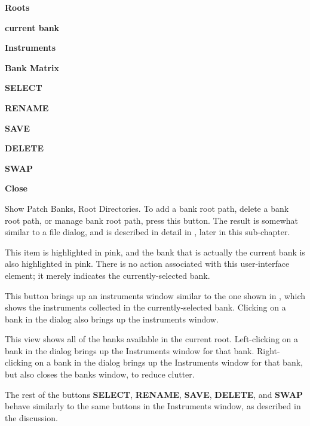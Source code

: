    \begin{enumber}
      \item \textbf{Roots}
      \item \textbf{current bank}
      \item \textbf{Instruments}
      \item \textbf{Bank Matrix}
      \item \textbf{SELECT}
      \item \textbf{RENAME}
      \item \textbf{SAVE}
      \item \textbf{DELETE}
      \item \textbf{SWAP}
      \item \textbf{Close}
   \end{enumber}

   \setcounter{ItemCounter}{0}      %

   Show Patch Banks, Root Directories.
   To add a bank root path, delete a bank root path, or manage bank root path,
   press this button.  The result is somewhat similar to a file dialog,
   and is described in detail in 
   , later in
   this sub-chapter.

   This item is highlighted in pink, and the bank that is actually the current
   bank is also highlighted in pink.  There is no action associated with this
   user-interface element; it merely indicates the currently-selected bank.

   This button brings up an instruments window similar
   to the one shown in
   , which shows
   the instruments collected in the currently-selected bank.
   Clicking on a bank in the dialog also brings up the instruments window.

   This view shows all of the banks available in the current root.
   Left-clicking on a bank in the dialog brings up the Instruments window for
   that bank.
   Right-clicking on a bank in the dialog brings up the Instruments window for
   that bank, but also closes the banks window, to reduce clutter.

   The rest of the buttons \textbf{SELECT}, \textbf{RENAME}, \textbf{SAVE},
   \textbf{DELETE}, and \textbf{SWAP} behave similarly to the same buttons in
   the Instruments window, as
   described in the
    discussion.

